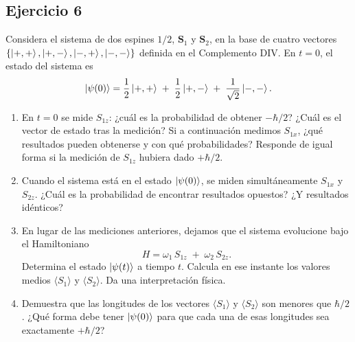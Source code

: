 \documentclass[a4paper,11pt]{article}
\begin{document}
\subsection*{Ejercicio 6}
Considera el sistema de dos espines \(1/2\), \(\mathbf{S}_1\) y \(\mathbf{S}_2\), en la base de cuatro vectores \(\{\ket{+,+},\ket{+,-},\ket{-,+},\ket{-,-}\}\) definida en el Complemento DIV. En \(t=0\), el estado del sistema es
\[
\ket{\psi(0)} = \frac12\ket{+,+} \;+\;\frac12\ket{+,-}\;+\;\frac1{\sqrt2}\ket{-,-}.
\]
\begin{enumerate}
  \item En \(t=0\) se mide \(S_{1z}\): ¿cuál es la probabilidad de obtener \(-\hbar/2\)? ¿Cuál es el vector de estado tras la medición? Si a continuación medimos \(S_{1x}\), ¿qué resultados pueden obtenerse y con qué probabilidades? Responde de igual forma si la medición de \(S_{1z}\) hubiera dado \(+\hbar/2\).
  \item Cuando el sistema está en el estado \(\ket{\psi(0)}\), se miden simultáneamente \(S_{1x}\) y \(S_{2z}\). ¿Cuál es la probabilidad de encontrar resultados opuestos? ¿Y resultados idénticos?
  \item En lugar de las mediciones anteriores, dejamos que el sistema evolucione bajo el Hamiltoniano
    \[
      H = \omega_1\,S_{1z} \;+\;\omega_2\,S_{2z}.
    \]
    Determina el estado \(\ket{\psi(t)}\) a tiempo \(t\). Calcula en ese instante los valores medios \(\langle S_1\rangle\) y \(\langle S_2\rangle\). Da una interpretación física.
  \item Demuestra que las longitudes de los vectores \(\langle S_1\rangle\) y \(\langle S_2\rangle\) son menores que \(\hbar/2\). ¿Qué forma debe tener \(\ket{\psi(0)}\) para que cada una de esas longitudes sea exactamente \(+\hbar/2\)?
\end{enumerate}
\end{document}
